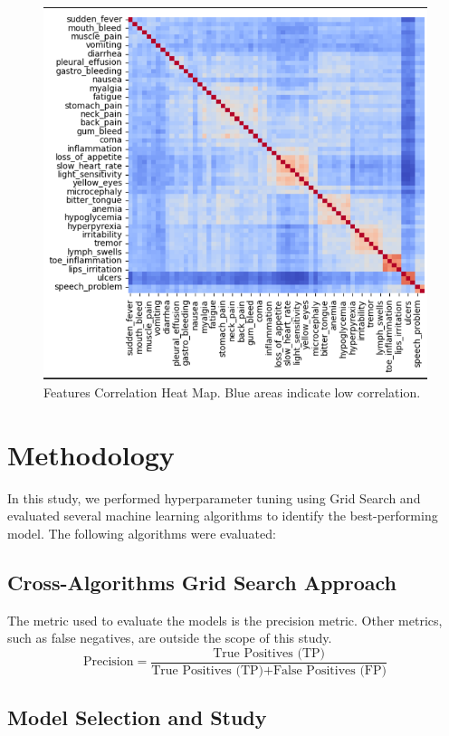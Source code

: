 \documentclass{article}
\begin{document}
\begin{figure}[H]  
\centering
\includegraphics[width=1\linewidth]{CorrelationMatrix.png}
\caption{Features Correlation Heat Map. Blue areas indicate low correlation.}
\vspace{-1em} %
\end{figure}

\section{Methodology}

In this study, we performed hyperparameter tuning using Grid Search and evaluated several machine
learning algorithms to identify the best-performing model. The following algorithms were evaluated:

\subsection{Cross-Algorithms Grid Search Approach}

The metric used to evaluate the models is the precision metric. Other metrics, such as false negatives,
are outside the scope of this study.
\[
\text{Precision} = \frac{\text{True Positives (TP)}}{\text{True Positives (TP)} + \text{False Positives (FP)}}
\]

\subsection{Model Selection and Study}
\end{document}
